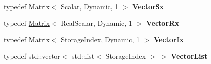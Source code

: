 \begin{DoxyCompactItemize}
typedef \mbox{\hyperlink{class_eigen_1_1_matrix}{Matrix}}$<$ Scalar, Dynamic, 1 $>$ {\bfseries Vector\+Sx}
\item 
\mbox{\label{class_eigen_1_1_incomplete_cholesky_aed6cab509254b9056381df357b3cbd07}} 
typedef \mbox{\hyperlink{class_eigen_1_1_matrix}{Matrix}}$<$ Real\+Scalar, Dynamic, 1 $>$ {\bfseries Vector\+Rx}
\item 
\mbox{\label{class_eigen_1_1_incomplete_cholesky_a1c096f4e4f262a94148e697eaa7890d9}} 
typedef \mbox{\hyperlink{class_eigen_1_1_matrix}{Matrix}}$<$ Storage\+Index, Dynamic, 1 $>$ {\bfseries Vector\+Ix}
\item 
\mbox{\label{class_eigen_1_1_incomplete_cholesky_aa758310799b31522f525e29cd8af7d46}} 
typedef std\+::vector$<$ std\+::list$<$ Storage\+Index $>$ $>$ {\bfseries Vector\+List}
\end{DoxyCompactItemize}
